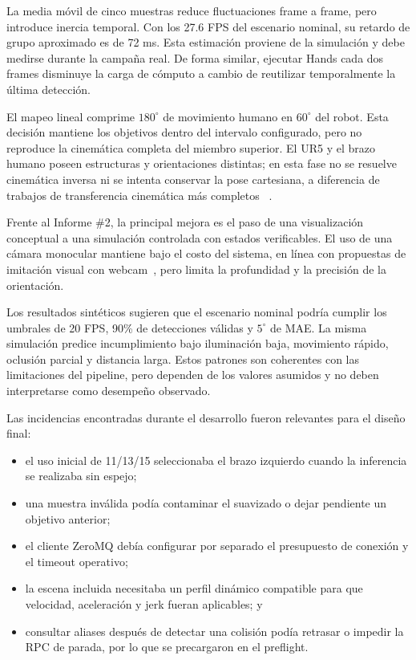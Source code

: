 La media móvil de cinco muestras reduce fluctuaciones frame a frame, pero
introduce inercia temporal. Con los 27.6 FPS del escenario nominal, su retardo
de grupo aproximado es de 72 ms. Esta estimación proviene de la simulación y
debe medirse durante la campaña real. De forma similar, ejecutar Hands cada dos
frames disminuye la carga de cómputo a cambio de reutilizar temporalmente la
última detección.

El mapeo lineal comprime $180^\circ$ de movimiento humano en $60^\circ$ del
robot. Esta decisión mantiene los objetivos dentro del intervalo configurado,
pero no reproduce la cinemática completa del miembro superior. El UR5 y el
brazo humano poseen estructuras y orientaciones distintas; en esta fase no se
resuelve cinemática inversa ni se intenta conservar la pose cartesiana, a
diferencia de trabajos de transferencia cinemática más completos
~\cite{wang2020fast,han2024robust}.

Frente al Informe \#2, la principal mejora es el paso de una visualización
conceptual a una simulación controlada con estados verificables. El uso de una
cámara monocular mantiene bajo el costo del sistema, en línea con propuestas
de imitación visual con webcam~\cite{xuan2017vision}, pero limita la
profundidad y la precisión de la orientación.

Los resultados sintéticos sugieren que el escenario nominal podría cumplir los
umbrales de 20 FPS, 90\% de detecciones válidas y $5^\circ$ de MAE. La misma
simulación predice incumplimiento bajo iluminación baja, movimiento rápido,
oclusión parcial y distancia larga. Estos patrones son coherentes con las
limitaciones del pipeline, pero dependen de los valores asumidos y no deben
interpretarse como desempeño observado.

Las incidencias encontradas durante el desarrollo fueron relevantes para el
diseño final:

\begin{itemize}
    \item el uso inicial de 11/13/15 seleccionaba el brazo izquierdo cuando la
    inferencia se realizaba sin espejo;
    \item una muestra inválida podía contaminar el suavizado o dejar pendiente
    un objetivo anterior;
    \item el cliente ZeroMQ debía configurar por separado el presupuesto de
    conexión y el timeout operativo;
    \item la escena incluida necesitaba un perfil dinámico compatible para que
    velocidad, aceleración y jerk fueran aplicables; y
    \item consultar aliases después de detectar una colisión podía retrasar o
    impedir la RPC de parada, por lo que se precargaron en el preflight.
\end{itemize}

